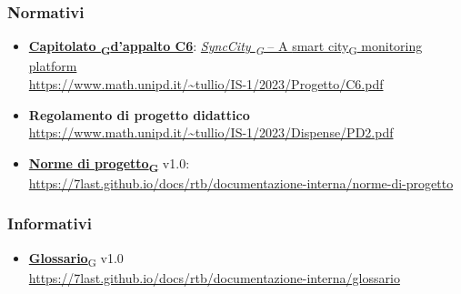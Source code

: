 \subsubsection{Normativi}
\begin{itemize}
	\item \href{https://7last.github.io/docs/rtb/documentazione-interna/glossario\#capitolato}{\textbf{Capitolato \textsubscript{G}d'appalto C6}}: \href{https://7last.github.io/docs/rtb/documentazione-interna/glossario\#synccity}{\textit{SyncCity \textsubscript{G}} – A \href{https://7last.github.io/docs/rtb/documentazione-interna/glossario\#smart-city}{smart city\textsubscript{G}} monitoring platform}\\
	\url{https://www.math.unipd.it/~tullio/IS-1/2023/Progetto/C6.pdf}
	\item \textbf{Regolamento di progetto didattico}\\
	      \url{https://www.math.unipd.it/~tullio/IS-1/2023/Dispense/PD2.pdf}
	\item \href{https://7last.github.io/docs/rtb/documentazione-interna/glossario\#norme-di-progetto}{\textbf{Norme di progetto\textsubscript{G}}} v1.0:\\
	\url{https://7last.github.io/docs/rtb/documentazione-interna/norme-di-progetto}
\end{itemize}
\subsubsection{Informativi}
\begin{itemize}
	\item \href{https://7last.github.io/docs/rtb/documentazione-interna/glossario\#glossario}{\textbf{Glossario}\textsubscript{G}} v1.0\\
	\url{https://7last.github.io/docs/rtb/documentazione-interna/glossario}
\end{itemize}
\newpage